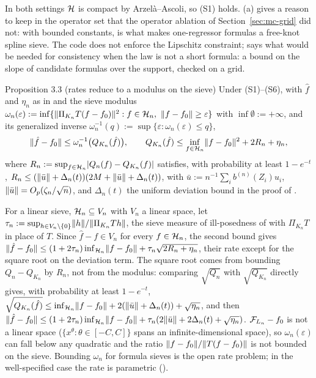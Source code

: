 In both settings $\mathcal{H}$ is compact by Arzel\`a--Ascoli, so (S1) holds. (a) gives a reason to keep  in the operator set that the operator ablation of Section~\ref{sec:mc-grid} did not: with bounded constants,  is what makes one-regressor formulas a free-knot spline sieve. The code does not enforce the Lipschitz constraint;  says what would be needed for consistency when the law is not a short formula: a bound on the slope of candidate formulas over the support, checked on a grid.

\begin{result}[Proposition3.3]{Proposition 3.3 (rates reduce to a modulus on the sieve)}
Under (S1)--(S6), with $\hat f$ and $\eta_n$ as in  and the sieve modulus $\omega_n(\varepsilon) := \inf\{\lVert \Pi_{K_n}T(f - f_0)\rVert^2 : f \in \mathcal{H}_n,\ \lVert f - f_0\rVert \ge \varepsilon\}$ with $\inf\emptyset := +\infty$, and its generalized inverse $\omega_n^{-1}(q) := \sup\{\varepsilon : \omega_n(\varepsilon) \le q\}$,
\[
\lVert \hat f - f_0\rVert \le \omega_n^{-1}\bigl(Q_{K_n}(\hat f)\bigr), \qquad Q_{K_n}(\hat f) \le \inf_{f \in \mathcal{H}_n}\lVert f - f_0\rVert^2 + 2R_n + \eta_n,
\]
where $R_n := \sup_{f \in \mathcal{H}_n}\lvert Q_n(f) - Q_{K_n}(f)\rvert$ satisfies, with probability at least $1 - e^{-t}$, $R_n \le (\lVert \bar u\rVert + \Delta_n(t))(2M + \lVert \bar u\rVert + \Delta_n(t))$, with $\bar u := n^{-1}\sum_ib^{(n)}(Z_i)u_i$, $\lVert \bar u\rVert = O_p(\zeta_n/\sqrt n)$, and $\Delta_n(t)$ the uniform deviation bound in the proof of .
\end{result}

For a linear sieve, $\mathcal{H}_n \subseteq V_n$ with $V_n$ a linear space, let $\tau_n := \sup_{h \in V_n \setminus \{0\}}\lVert h\rVert/\lVert \Pi_{K_n}Th\rVert$, the sieve measure of ill-posedness of \citet{chenpouzo2012} with $\Pi_{K_n}T$ in place of $T$. Since $\hat f - f \in V_n$ for every $f \in \mathcal{H}_n$, the second bound gives $\lVert \hat f - f_0\rVert \le (1 + 2\tau_n)\inf_{\mathcal{H}_n}\lVert f - f_0\rVert + \tau_n\sqrt{2R_n + \eta_n}$, their rate except for the square root on the deviation term. The square root comes from bounding $Q_n - Q_{K_n}$ by $R_n$, not from the modulus: comparing $\sqrt{Q_n}$ with $\sqrt{Q_{K_n}}$ directly gives, with probability at least $1 - e^{-t}$, $\sqrt{Q_{K_n}(\hat f)} \le \inf_{\mathcal{H}_n}\lVert f - f_0\rVert + 2(\lVert \bar u\rVert + \Delta_n(t)) + \sqrt{\eta_n}$, and then $\lVert \hat f - f_0\rVert \le (1 + 2\tau_n)\inf_{\mathcal{H}_n}\lVert f - f_0\rVert + \tau_n(2\lVert \bar u\rVert + 2\Delta_n(t) + \sqrt{\eta_n})$. $\mathcal{F}_{L_n} - f_0$ is not a linear space ($\{x^\theta : \theta \in [-C, C]\}$ spans an infinite-dimensional space), so $\omega_n(\varepsilon)$ can fall below any quadratic and the ratio $\lVert f - f_0\rVert/\lVert T(f - f_0)\rVert$ is not bounded on the sieve. Bounding $\omega_n$ for formula sieves is the open rate problem; in the well-specified case the rate is parametric ().
